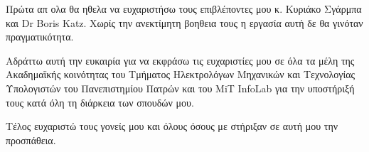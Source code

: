 Πρώτα απ ολα θα ηθελα να ευχαριστήσω τους επιβλέποντες μου κ. Κυριάκο
Σγάρμπα και Dr Boris Katz. Χωρίς την ανεκτίμητη βοηθεια τους η εργασία
αυτή δε θα γινόταν πραγματικότητα.

Αδράττω αυτή την ευκαιρία για να εκφράσω τις ευχαριστίες μου σε όλα τα
μέλη της Ακαδημαϊκής κοινότητας του Τμήματος Ηλεκτρολόγων Μηχανικών
και Τεχνολογίας Υπολογιστών του Πανεπιστημίου Πατρών και του MiT
InfoLab για την υποστήριξή τους κατά όλη τη διάρκεια των σπουδών μου.


Τέλος ευχαριστώ τους γονείς μου και όλους όσους με στήριξαν σε αυτή
μου την προσπάθεια.

\afterpage{\blankpage}
\newpage
\tableofcontents
